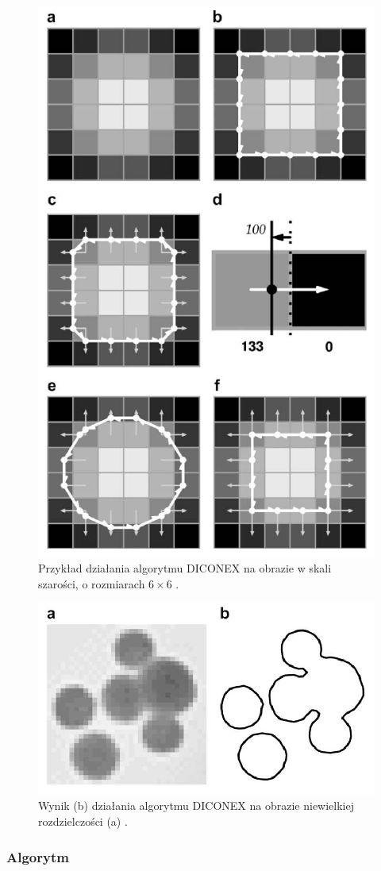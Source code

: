 \begin{figure}[ht]
	\centering
	\includegraphics[width=.55\textwidth]{images/DICONEX_EX.png}
	\caption{Przykład działania algorytmu DICONEX na obrazie w skali szarości, o rozmiarach $6 \times 6$ \cite{Schlei2009}.}
	\label{fig:diconex_ex}
\end{figure}

\begin{figure}[ht]
	\centering
	\includegraphics[width=.70\textwidth]{images/DICONEX_EX_RES.png}
	\caption{Wynik (b) działania algorytmu DICONEX na obrazie niewielkiej rozdzielczości (a) \cite{Schlei2009}.}
	\label{fig:diconex_ex_res}
\end{figure}

\label{dixonex_alg}
\subsubsection{Algorytm}

